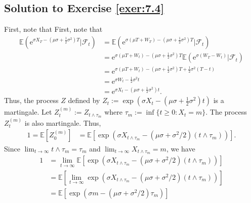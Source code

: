 \documentclass[12pt]{book}
\numberwithin{equation}{chapter}
\theoremstyle{plain}
\numberwithin{theorem}{section}
\theoremstyle{definition}
\numberwithin{exercise}{chapter}
\newcommand{\<}{\langle}
\renewcommand{\>}{\rangle}
\renewcommand{\(}{\left(}
\renewcommand{\)}{\right)}
\renewcommand{\[}{\left[}
\renewcommand{\]}{\right]}
\newcommand\Eb{\mathds{E}}
\newcommand\Fc{\mathscr{F}}
\newcommand\sig{\sigma}
\newcommand\ee{\mathrm{e}}
\begin{document}
\subsection*{Solution to Exercise \ref{exer:7.4}}
First, note that
First, note that
\begin{align}
\Eb( \ee^{ \sig X_T - (\mu \sig + \tfrac{1}{2}\sig^2) T} | \Fc_t )
	&=	\Eb( \ee^{ \sig (\mu T + W_T)  - (\mu \sig + \tfrac{1}{2}\sig^2) T } | \Fc_t ) \\
	&=	\ee^{ \sig (\mu T + W_t)  - (\mu \sig + \tfrac{1}{2}\sig^2) T } \Eb( \ee^{ \sig (W_T - W_t) } | \Fc_t ) \\
	&=	\ee^{ \sig ( \mu T + W_t )  - (\mu \sig + \tfrac{1}{2}\sig^2) T + \tfrac{1}{2}\sig^2 (T-t)} \\
	&=	\ee^{ \sig W_t - \tfrac{1}{2} \sig^2 t  } \\
	&=	\ee^{ \sig X_t - ( \mu \sig + \tfrac{1}{2} \sig^2 ) t  } .
\end{align}
Thus, the process $Z$ defined by $Z_t := \exp ( \sig X_t - ( \mu \sig + \tfrac{1}{2} \sig^2 ) t )$ is a martingale.
Let $Z_t^{(m)} := Z_{t \wedge \tau_m}$ where $\tau_m := \inf\{t \geq 0 : X_t = m \}$.  The process $Z_t^{(m)}$ is also martingale. Thus,
\begin{align}
1
	= \Eb[ Z_0^{(m)}]
	&= \Eb\[ 
	      \exp ( \sigma X_{t \wedge \tau_m} - (\mu \sigma+ \sigma^2 / 2)(t\wedge \tau_m) )
	     \].
\end{align}
Since $\lim_{t\to\infty} t \wedge \tau_m = \tau_m$ and $\lim_{t\to\infty} X_{t \wedge \tau_m} = m$, we have
\begin{align}
1 
	&= \lim_{t\to\infty} \Eb\[ 
	      \exp ( \sigma X_{t \wedge \tau_m} - (\mu \sigma+ \sigma^2 / 2)(t\wedge \tau_m) )
	     \] \\
	&= \Eb\[\lim_{t\to\infty}  
	      \exp ( \sigma X_{t \wedge \tau_m} - (\mu \sigma+ \sigma^2 / 2)(t\wedge \tau_m) )
	     \] \\
	&= \Eb\[ 
	       \exp ( \sigma m - (\mu \sigma+ \sigma^2 / 2)\tau_m )
	      \]
\end{align}
\end{document}
